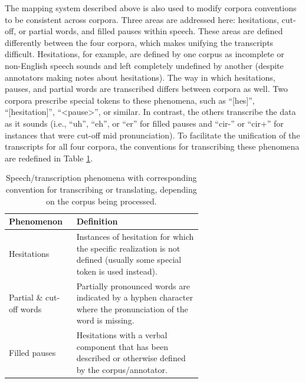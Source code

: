 \documentclass[12pt]{article}
\begin{document}
The mapping system described above is also used to modify corpora conventions to be consistent across corpora. Three areas are addressed here: hesitations, cut-off, or partial words, and filled pauses within speech. These areas are defined differently between the four corpora, which makes unifying the transcripts difficult. Hesitations, for example, are defined by one corpus as incomplete or non-English speech sounds and left completely undefined by another (despite annotators making notes about hesitations). The way in which hesitations, pauses, and partial words are transcribed differs between corpora as well. Two corpora prescribe special tokens to these phenomena, such as ``[hes]'', ``[hesitation]'', ``<pause>'', or similar. In contrast, the others transcribe the data as it sounds (i.e., ``uh'', ``eh'', or ``er'' for filled pauses and ``cir-'' or ``cir+'' for instances that were cut-off mid pronunciation). To facilitate the unification of the transcripts for all four corpora, the conventions for transcribing these phenomena are redefined in Table \ref{tab:phenomena_definitions}.

\begin{table}[!t]
    \centering
    \begin{tabular}{l p{0.65\linewidth}}
        \toprule
        Phenomenon               & Definition                                                                                                              \\
        \midrule
        Hesitations              & Instances of hesitation for which the specific realization is not defined (usually some special token is used instead). \\
        \midrule
        Partial \& cut-off words & Partially pronounced words are indicated by a hyphen character where the pronunciation of the word is missing.          \\
        \midrule
        Filled pauses            & Hesitations with a verbal component that has been described or otherwise defined by the corpus/annotator.               \\
        \bottomrule
    \end{tabular}
    \caption{Speech/transcription phenomena with corresponding convention for transcribing or translating, depending on the corpus being processed.}
    \label{tab:phenomena_definitions}
\end{table}
\end{document}

